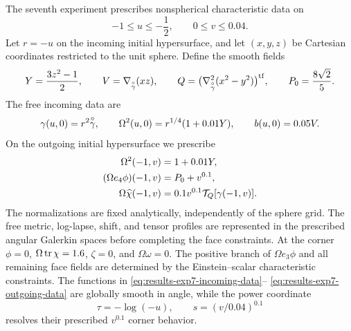 The seventh experiment prescribes nonspherical characteristic data on
\begin{equation}\label{eq:results-exp7-domain}
  -1\leq u\leq-\frac12,
  \qquad 0\leq v\leq0.04.
\end{equation}
Let $r=-u$ on the incoming initial hypersurface, and let $(x,y,z)$ be
Cartesian coordinates restricted to the unit sphere.  Define the smooth fields
\begin{equation}
  Y=\frac{3z^2-1}{2},\qquad V=\nabla_{\overset{\circ}{\gamma}}(xz),\qquad
  Q=\bigl(\nabla^2_{\overset{\circ}{\gamma}}(x^2-y^2)\bigr)^{\mathrm{tf}},
  \qquad P_0=\frac{8\sqrt2}{5}.
\end{equation}
The free incoming data are
\begin{equation}\label{eq:results-exp7-incoming-data}
  \gamma(u,0)=r^2\overset{\circ}{\gamma},\qquad
  \Omega^2(u,0)=r^{1/4}(1+0.01Y),\qquad b(u,0)=0.05V.
\end{equation}
On the outgoing initial hypersurface we prescribe
\begin{align}\label{eq:results-exp7-outgoing-data}
  \Omega^2(-1,v)&=1+0.01Y,\\
  (\Omega e_4\phi)(-1,v)&=P_0+v^{0.1},\\
  \Omega\widehat\chi(-1,v)&=0.1v^{0.1}\mathcal T_Q[\gamma(-1,v)].
\end{align}
The normalizations are fixed analytically, independently of the sphere grid.
The free metric, log-lapse, shift, and tensor profiles are represented in the
prescribed angular Galerkin spaces before completing the face constraints.
At the corner $\phi=0$, $\Omega\operatorname{tr}\chi=1.6$, $\zeta=0$, and
$\Omega\omega=0$.  The positive branch of $\Omega e_3\phi$ and all remaining
face fields are determined by the Einstein--scalar characteristic
constraints.  The functions in \eqref{eq:results-exp7-incoming-data}--
\eqref{eq:results-exp7-outgoing-data} are globally smooth in angle, while the
power coordinate
\begin{equation}
  \tau=-\log(-u),\qquad s=(v/0.04)^{0.1}
\end{equation}
resolves their prescribed $v^{0.1}$ corner behavior.


